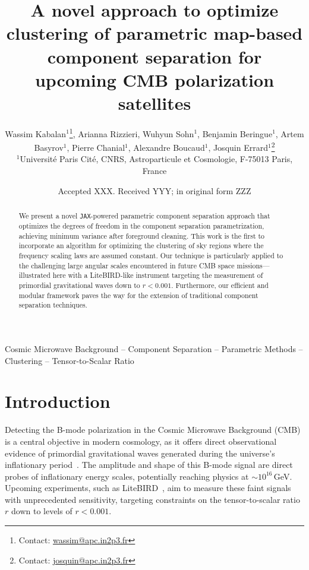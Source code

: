 \documentclass[fleqn,usenatbib]{mnras}
\title[Optimized Clustering for CMB Component Separation]{A novel approach to optimize clustering of parametric map-based component separation for upcoming CMB polarization satellites}
\author[W. Kabalan et al.]{
Wassim Kabalan$^{1}$\thanks{Contact: \href{mailto:wassim@apc.in2p3.fr}{wassim@apc.in2p3.fr}}, 
Arianna Rizzieri,
Wuhyun Sohn$^{1}$,
Benjamin Beringue$^{1}$,
Artem Basyrov$^{1}$,
\newauthor
Pierre Chanial$^{1}$,
Alexandre Boucaud$^{1}$,
Josquin Errard$^{1}$\thanks{Contact: \href{mailto:josquin@apc.in2p3.fr}{josquin@apc.in2p3.fr}}
\\
$^{1}$Université Paris Cité, CNRS, Astroparticule et Cosmologie, F-75013 Paris, France
}
\date{Accepted XXX. Received YYY; in original form ZZZ}
\begin{document}
\label{firstpage}
\pagerange{\pageref{firstpage}--\pageref{lastpage}}
\maketitle

\begin{abstract}
We present a novel \texttt{JAX}-powered parametric component separation approach that optimizes the degrees of freedom in the component separation parametrization, achieving minimum variance after foreground cleaning. This work is the first to incorporate an algorithm for optimizing the clustering of sky regions where the frequency scaling laws are assumed constant. Our technique is particularly applied to the challenging large angular scales encountered in future CMB space missions—illustrated here with a LiteBIRD-like instrument targeting the measurement of primordial gravitational waves down to \( r < 0.001 \). Furthermore, our efficient and modular framework paves the way for the extension of traditional component separation techniques.
\end{abstract}

\begin{keywords}
Cosmic Microwave Background -- Component Separation -- Parametric Methods -- Clustering -- Tensor-to-Scalar Ratio
\end{keywords}




\section{Introduction}

Detecting the B-mode polarization in the Cosmic Microwave Background (CMB) is a central objective in modern cosmology, as it offers direct observational evidence of primordial gravitational waves generated during the universe’s inflationary period~\citep{Kamionkowski1997, Seljak1997}. The amplitude and shape of this B-mode signal are direct probes of inflationary energy scales, potentially reaching physics at $\sim10^{16}$\,GeV. Upcoming experiments, such as LiteBIRD~\citep{LiteBIRD2022}, aim to measure these faint signals with unprecedented sensitivity, targeting constraints on the tensor-to-scalar ratio $r$ down to levels of $r < 0.001$.
\end{document}

